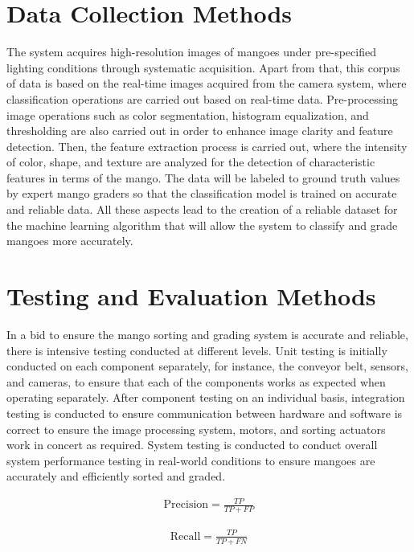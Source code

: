 \section{Data Collection Methods}
The system acquires high-resolution images of mangoes under pre-specified lighting conditions through systematic acquisition. Apart from that, this corpus of data is based on the real-time images acquired from the camera system, where classification operations are carried out based on real-time data. Pre-processing image operations such as color segmentation, histogram equalization, and thresholding are also carried out in order to enhance image clarity and feature detection. Then, the feature extraction process is carried out, where the intensity of color, shape, and texture are analyzed for the detection of characteristic features in terms of the mango. The data will be labeled to ground truth values by expert mango graders so that the classification model is trained on accurate and reliable data. All these aspects lead to the creation of a reliable dataset for the machine learning algorithm that will allow the system to classify and grade mangoes more accurately.

\section{Testing and Evaluation Methods}
In a bid to ensure the mango sorting and grading system is accurate and reliable, there is intensive testing conducted at different levels. Unit testing is initially conducted on each component separately, for instance, the conveyor belt, sensors, and cameras, to ensure that each of the components works as expected when operating separately. After component testing on an individual basis, integration testing is conducted to ensure communication between hardware and software is correct to ensure the image processing system, motors, and sorting actuators work in concert as required. System testing is conducted to conduct overall system performance testing in real-world conditions to ensure mangoes are accurately and efficiently sorted and graded.

\begin{eqnarray}
	\text{Precision} = \frac{TP}{TP + FP}
	\label{eq:precision}
\end{eqnarray}

\begin{eqnarray}
	\text{Recall} = \frac{TP}{TP + FN}
	\label{eq:recall}
\end{eqnarray}


